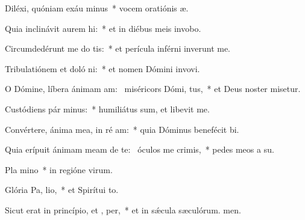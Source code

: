 \item Diléxi, quóniam exáu minus~* vocem oratiónis æ.
\item Quia inclinávit aurem  hi:~* et in diébus meis invobo.
\item Circumdedérunt me do tis:~* et perícula inférni inverunt me.
\item Tribulatiónem et doló ni:~* et nomen Dómini invovi.
\item O Dómine, líbera ánimam am:~\pscross{} miséricors Dómi,  tus,~* et Deus noster misetur.
\item Custódiens pár minus:~* humiliátus sum, et libevit me.
\item Convértere, ánima mea, in ré am:~* quia Dóminus benefécit bi.
\item Quia erípuit ánimam meam de te:~\pscross{} óculos me  crimis,~* pedes meos a su.
\item Pla mino~* in regióne virum.
\item Glória Pa,  lio,~* et Spirítui to.
\item Sicut erat in princípio, et ,  per,~* et in sǽcula sæculórum. men.
